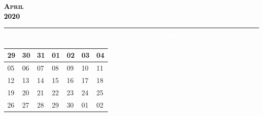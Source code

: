 \documentclass{article}
\newcommand{\daysize}{2.5cm}		%
\newcommand{\dw}{3.5cm}					%
\newcommand{\mkday}[1]{
  #1
  \vspace{\daysize}
}
\begin{document}
		\begin{center}
			\textsc{\LARGE \textbf{\textcolor{black}{
			April
			}}}\\ %
			\textsc{\large \textbf{\textcolor{black}{
			2020
			}}} %
		\end{center}

		\begin{center}
		\begin{tabular}{| p{\dw} | p{\dw} | p{\dw} | p{\dw} | p{\dw} | p{\dw} | p{\dw} |}
			\hline
			\cellcolor{bannercolor} \textcolor{white}{Sunday} &
			\cellcolor{bannercolor} \textcolor{white}{Monday} &
			\cellcolor{bannercolor} \textcolor{white}{Tuesday} &
			\cellcolor{bannercolor} \textcolor{white}{Wednesday} &
			\cellcolor{bannercolor} \textcolor{white}{Thursday} &
			\cellcolor{bannercolor} \textcolor{white}{Friday} &
			\cellcolor{bannercolor} \textcolor{white}{Saturday} \\
			\hline
		\end{tabular}

		\vspace{0.1cm}

		\begin{tabular}{| p{\dw} | p{\dw} | p{\dw} | p{\dw} | p{\dw} | p{\dw} | p{\dw} |}
\hline 
\cellcolor{weekendcolor}\mkday{
    29
} & 
\mkday{
    30
} &
\mkday{
    31
} &
\mkday{
    01
} &
\mkday{
    02
} &
\mkday{
    03
} &
\cellcolor{weekendcolor}\mkday{
    04
} 
\\
\hline 
\cellcolor{weekendcolor}\mkday{
    05
} & 
\mkday{
    06
} &
\mkday{
    07
} &
\mkday{
    08
} &
\mkday{
    09
} &
\mkday{
    10
} &
\cellcolor{weekendcolor}\mkday{
    11
} 
\\
\hline 
\cellcolor{weekendcolor}\mkday{
    12
} & 
\mkday{
    13
} &
\mkday{
    14
} &
\mkday{
    15
} &
\mkday{
    16
} &
\mkday{
    17
} &
\cellcolor{weekendcolor}\mkday{
    18
} 
\\
\hline 
\cellcolor{weekendcolor}\mkday{
    19
} & 
\mkday{
    20
} &
\mkday{
    21
} &
\mkday{
    22
} &
\mkday{
    23
} &
\mkday{
    24
} &
\cellcolor{weekendcolor}\mkday{
    25
} 
\\
\hline 
\cellcolor{weekendcolor}\mkday{
    26
} & 
\mkday{
    27
} &
\mkday{
    28
} &
\mkday{
    29
} &
\mkday{
    30
} &
\mkday{
    01
} &
\cellcolor{weekendcolor}\mkday{
    02
} 
\\
		\end{tabular}

		\end{center}
\end{document}
